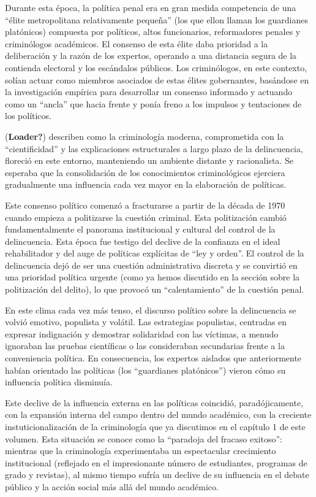 \documentclass[
  spanish,
  letterpaper,
  DIV=11,
  numbers=noendperiod]{scrreprt}
\begin{document}
Durante esta época, la política penal era en gran medida competencia de
una ``élite metropolitana relativamente pequeña'' (los que ellon llaman
los guardianes platónicos) compuesta por políticos, altos funcionarios,
reformadores penales y criminólogos académicos. El consenso de esta
élite daba prioridad a la deliberación y la razón de los expertos,
operando a una distancia segura de la contienda electoral y los
escándalos públicos. Los criminólogos, en este contexto, solían actuar
como miembros asociados de estas élites gobernantes, basándose en la
investigación empírica para desarrollar un consenso informado y actuando
como un ``ancla'' que hacia frente y ponía freno a los impulsos y
tentaciones de los políticos.

(\textbf{Loader?}) describen como la criminología moderna, comprometida
con la ``cientificidad'' y las explicaciones estructurales a largo plazo
de la delincuencia, floreció en este entorno, manteniendo un ambiente
distante y racionalista. Se esperaba que la consolidación de los
conocimientos criminológicos ejerciera gradualmente una influencia cada
vez mayor en la elaboración de políticas.

Este consenso político comenzó a fracturarse a partir de la década de
1970 cuando empieza a politizarse la cuestión criminal. Esta
politización cambió fundamentalmente el panorama institucional y
cultural del control de la delincuencia. Esta época fue testigo del
declive de la confianza en el ideal rehabilitador y del auge de
políticas explícitas de ``ley y orden''. El control de la delincuencia
dejó de ser una cuestión administrativa discreta y se convirtió en una
prioridad política urgente (como ya hemos discutido en la sección sobre
la politización del delito), lo que provocó un ``calentamiento'' de la
cuestión penal.

En este clima cada vez más tenso, el discurso político sobre la
delincuencia se volvió emotivo, populista y volátil. Las estrategias
populistas, centradas en expresar indignación y demostrar solidaridad
con las víctimas, a menudo ignoraban las pruebas científicas o las
consideraban secundarias frente a la conveniencia política. En
consecuencia, los expertos aislados que anteriormente habían orientado
las políticas (los ``guardianes platónicos'') vieron cómo su influencia
política disminuía.

Este declive de la influencia externa en las políticas coincidió,
paradójicamente, con la expansión interna del campo dentro del mundo
académico, con la creciente instuticionalización de la criminología que
ya discutimos en el capítulo 1 de este volumen. Esta situación se conoce
como la ``paradoja del fracaso exitoso'': mientras que la criminología
experimentaba un espectacular crecimiento institucional (reflejado en el
impresionante número de estudiantes, programas de grado y revistas), al
mismo tiempo sufría un declive de su influencia en el debate público y
la acción social más allá del mundo académico.
\end{document}
